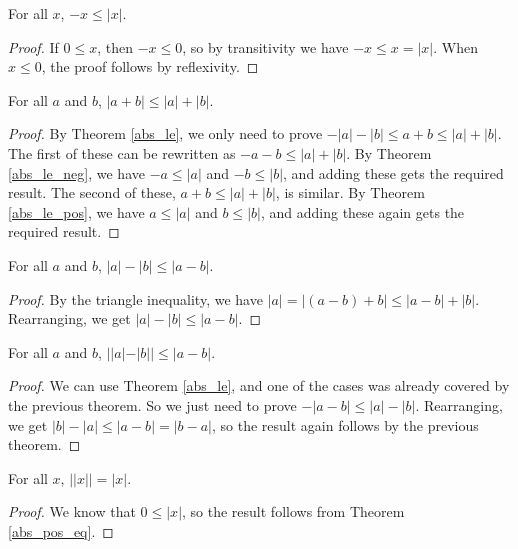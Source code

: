 \documentclass[../math.tex]{subfiles}
\begin{document}
\begin{theorem} \label{abs_le_neg}
    For all $x$, $-x \leq |x|$.
\end{theorem}
\begin{proof}
    If $0 \leq x$, then $-x \leq 0$, so by transitivity we have $-x \leq x =
    |x|$.  When $x \leq 0$, the proof follows by reflexivity.
\end{proof}

\begin{theorem}
    For all $a$ and $b$, $|a + b| \leq |a| + |b|$.
\end{theorem}
\begin{proof}
    By Theorem \ref{abs_le}, we only need to prove $-|a| - |b| \leq a + b \leq
    |a| + |b|$.  The first of these can be rewritten as $-a - b \leq |a| + |b|$.
    By Theorem \ref{abs_le_neg}, we have $-a \leq |a|$ and $-b \leq |b|$, and
    adding these gets the required result.  The second of these, $a + b \leq |a|
    + |b|$, is similar.  By Theorem \ref{abs_le_pos}, we have $a \leq |a|$ and
    $b \leq |b|$, and adding these again gets the required result.
\end{proof}

\begin{theorem}
    For all $a$ and $b$, $|a| - |b| \leq |a - b|$.
\end{theorem}
\begin{proof}
    By the triangle inequality, we have $|a| = |(a - b) + b| \leq |a - b| +
    |b|$.  Rearranging, we get $|a| - |b| \leq |a - b|$.
\end{proof}

\begin{theorem}
    For all $a$ and $b$, $||a| - |b|| \leq |a - b|$.
\end{theorem}
\begin{proof}
    We can use Theorem \ref{abs_le}, and one of the cases was already covered by
    the previous theorem.  So we just need to prove $-|a - b| \leq |a| - |b|$.
    Rearranging, we get $|b| - |a| \leq |a - b| = |b - a|$, so the result again
    follows by the previous theorem.
\end{proof}

\begin{theorem}
    For all $x$, $||x|| = |x|$.
\end{theorem}
\begin{proof}
    We know that $0 \leq |x|$, so the result follows from Theorem
    \ref{abs_pos_eq}.
\end{proof}
\end{document}
